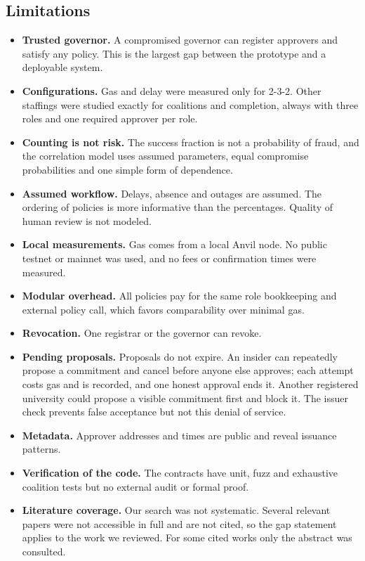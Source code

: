 \subsection{Limitations}
\begin{itemize}
\item \textbf{Trusted governor.} A compromised governor can register approvers and satisfy any policy. This is the largest gap between the prototype and a deployable system.
\item \textbf{Configurations.} Gas and delay were measured only for 2-3-2. Other staffings were studied exactly for coalitions and completion, always with three roles and one required approver per role.
\item \textbf{Counting is not risk.} The success fraction is not a probability of fraud, and the correlation model uses assumed parameters, equal compromise probabilities and one simple form of dependence.
\item \textbf{Assumed workflow.} Delays, absence and outages are assumed. The ordering of policies is more informative than the percentages. Quality of human review is not modeled.
\item \textbf{Local measurements.} Gas comes from a local Anvil node. No public testnet or mainnet was used, and no fees or confirmation times were measured.
\item \textbf{Modular overhead.} All policies pay for the same role bookkeeping and external policy call, which favors comparability over minimal gas.
\item \textbf{Revocation.} One registrar or the governor can revoke.
\item \textbf{Pending proposals.} Proposals do not expire. An insider can repeatedly propose a commitment and cancel before anyone else approves; each attempt costs gas and is recorded, and one honest approval ends it. Another registered university could propose a visible commitment first and block it. The issuer check prevents false acceptance but not this denial of service.
\item \textbf{Metadata.} Approver addresses and times are public and reveal issuance patterns.
\item \textbf{Verification of the code.} The contracts have unit, fuzz and exhaustive coalition tests but no external audit or formal proof.
\item \textbf{Literature coverage.} Our search was not systematic. Several relevant papers were not accessible in full and are not cited, so the gap statement applies to the work we reviewed. For some cited works only the abstract was consulted.
\end{itemize}
